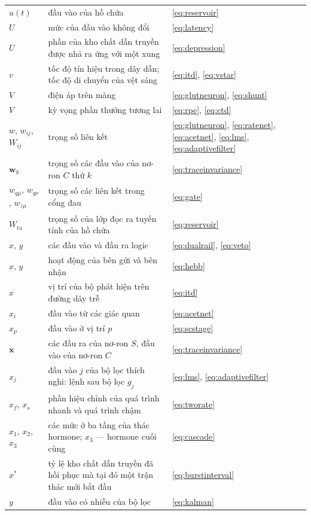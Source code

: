 \begin{center}
\begin{longtable}{>{\raggedright}p{2.0cm}>{\raggedright}p{9.6cm}>{\raggedright\arraybackslash}p{2.4cm}}
$u(t)$ & đầu vào của hồ chứa & \eqref{eq:reservoir} \\
$U$ & mức của đầu vào không đổi & \eqref{eq:latency} \\
$U$ & phần của kho chất dẫn truyền được nhả ra ứng với một xung & \eqref{eq:depression} \\
$v$ & tốc độ tín hiệu trong dây dẫn; tốc độ di chuyển của vệt sáng & \eqref{eq:itd}, \eqref{eq:vstar} \\
$V$ & điện áp trên màng & \eqref{eq:glutneuron}, \eqref{eq:shunt} \\
$V$ & kỳ vọng phần thưởng tương lai & \eqref{eq:rpe}, \eqref{eq:ctd} \\
$w$, $w_{ij}$, $W_{ij}$ & trọng số liên kết & \eqref{eq:glutneuron}, \eqref{eq:ratenet}, \eqref{eq:acetnet}, \eqref{eq:lms}, \eqref{eq:adaptivefilter} \\
$\mathbf w_k$ & trọng số các đầu vào của nơ-ron $C$ thứ $k$ & \eqref{eq:traceinvariance} \\
$w_{q\mu}$, $w_{q\nu}$, $w_{z\mu}$ & trọng số các liên kết trong cổng đau & \eqref{eq:gate} \\
$W_{\text{ra}}$ & trọng số của lớp đọc ra tuyến tính của hồ chứa & \eqref{eq:reservoir} \\
$x$, $y$ & các đầu vào và đầu ra logic & \eqref{eq:dualrail}, \eqref{eq:veto} \\
$x$, $y$ & hoạt động của bên gửi và bên nhận & \eqref{eq:hebb} \\
$x$ & vị trí của bộ phát hiện trên đường dây trễ & \eqref{eq:itd} \\
$x_i$ & đầu vào từ các giác quan & \eqref{eq:acetnet} \\
$x_p$ & đầu vào ở vị trí $p$ & \eqref{eq:scstage} \\
$\mathbf x$ & các đầu ra của nơ-ron $S$, đầu vào của nơ-ron $C$ & \eqref{eq:traceinvariance} \\
$x_j$ & đầu vào $j$ của bộ lọc thích nghi: lệnh sau bộ lọc $g_j$ & \eqref{eq:lms}, \eqref{eq:adaptivefilter} \\
$x_f$, $x_s$ & phần hiệu chỉnh của quá trình nhanh và quá trình chậm & \eqref{eq:tworate} \\
$x_1$, $x_2$, $x_3$ & các mức ở ba tầng của thác hormone; $x_3$ --- hormone cuối cùng & \eqref{eq:cascade} \\
$x^*$ & tỷ lệ kho chất dẫn truyền đã hồi phục mà tại đó một trận thác mới bắt đầu & \eqref{eq:burstinterval} \\
$y$ & đầu vào có nhiễu của bộ lọc & \eqref{eq:kalman} \\

\end{longtable}
\end{center}
